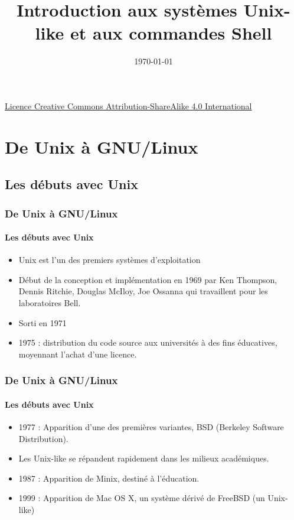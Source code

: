 \documentclass{beamer}
\title[Introduction à GNU/Linux
\hspace{25mm} \insertframenumber/\inserttotalframenumber]
{Introduction aux systèmes Unix-like et aux commandes Shell}%
\author[Jean-Philippe Eisenbarth et Quentin Laporte-Chabasse] %
{}
\institute[Telecom Nancy, Université de Lorraine] %
{
  Telecom Nancy, Université de Lorraine
}
\date{\today} %
{}
\begin{document}
    \begin{frame}
      \titlepage

      \begin{center}
        {\scriptsize \centerline{\href{http://creativecommons.org/licenses/by-sa/4.0/}{Licence Creative Commons 
Attribution-ShareAlike 4.0 International}}}
        \bysa{}
      \end{center}
    \end{frame}
    
    \frame{\tableofcontents}
    
    \section[De Unix à GNU/Linux]{De Unix à GNU/Linux}
    
        \subsection[Les débuts avec Unix]{Les débuts avec Unix}
        
            \begin{frame}
                \frametitle{De Unix à GNU/Linux}
                \framesubtitle{Les débuts avec Unix}
                \begin{itemize}
                    \item Unix est l'un des premiers systèmes d'exploitation
                    \item Début de la conception et implémentation en 1969 par Ken Thompson, Dennis Ritchie, Douglas McIloy, Joe Ossanna qui travaillent pour les laboratoires Bell.
                    \item Sorti en 1971
                    \item 1975 : distribution du code source aux universités à des fins éducatives, moyennant l'achat d'une licence.
                \end{itemize}
            \end{frame}
            
            \begin{frame}[t]{\insertsubsectionhead}
                \frametitle{De Unix à GNU/Linux}
                \framesubtitle{Les débuts avec Unix}
                \begin{itemize}
                    \item 1977 : Apparition d'une des premières variantes, BSD (Berkeley Software Distribution).
                    \item Les Unix-like se répandent rapidement dans les milieux académiques.
                    \item 1987 : Apparition de Minix, destiné à l'éducation.
                    \item 1999 : Apparition de Mac OS X, un système dérivé de FreeBSD (un Unix-like)
                \end{itemize}
            \end{frame}
            
\end{document}
